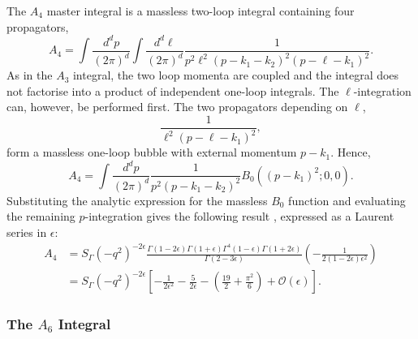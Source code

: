The $A_4$ master integral is a massless two-loop integral containing four propagators,
\begin{equation}
    A_4 = \int \frac{d^dp}{(2\pi)^d}\int\frac{d^d\ell}{(2\pi)^d}\frac1{p^2\ell^2(p-k_1-k_2)^2(p-\ell-k_1)^2}.
\end{equation}
As in the $A_3$ integral, the two loop momenta are coupled and the integral does not factorise into a
product of independent one-loop integrals. The $\ell$-integration can, however, be performed first.
The two propagators depending on $\ell$,
\begin{equation}
    \frac1{\ell^2(p-\ell-k_1)^2},
\end{equation}
form a massless one-loop bubble with external momentum $p-k_1$. Hence,
\begin{equation}
    A_4 = \int\frac{d^dp}{(2\pi)^d}\frac1{p^2(p-k_1-k_2)^2}B_0\!\left((p-k_1)^2;0,0\right).
\end{equation}
Substituting the analytic expression for the massless $B_0$ function and evaluating the remaining
$p$-integration gives the following result \cite{Gehrmann-DeRidder:2005btv}, expressed as a Laurent
series in $\epsilon$:
\begin{equation}
    \begin{split}
        A_4 &= S_\Gamma\!\left(-q^2\right)^{-2\epsilon}\frac{\Gamma(1-2\epsilon)\Gamma(1+\epsilon)\Gamma^4(1-\epsilon)\Gamma(1+2\epsilon)}{\Gamma(2-3\epsilon)}\!\left(-\frac1{2(1-2\epsilon)\epsilon^2}\right)\\
            &= S_\Gamma\!\left(-q^2\right)^{-2\epsilon}\!\left[-\frac1{2\epsilon^2}-\frac5{2\epsilon}-\left(\frac{19}2+\frac{\pi^2}6\right)+\mathcal O(\epsilon)\right].
    \end{split}
\end{equation}

\subsubsection*{The $A_6$ Integral}

